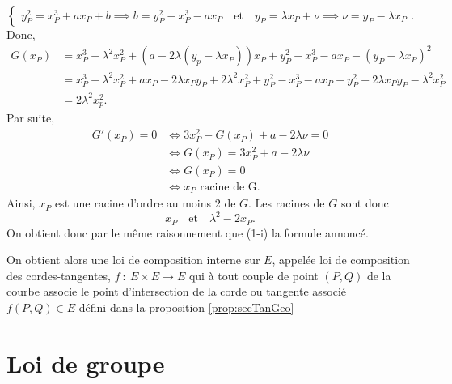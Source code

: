 \begin{demonstration}
\begin{description}
\begin{description}
\[\begin{cases}
                y_P^2=x_P^3+ax_P+b \implies b=y_P^2-x_P^3-ax_P \quad \text{et} \quad y_P=\lambda x_P + \nu \implies \nu = y_P - \lambda x_P
                    \end{cases}
                .\] 
                Donc,
                \begin{align*}
                    G(x_P) &=x_P^3-\lambda^2x_P^2+\left( a-2\lambda\left( y_p-\lambda x_P \right)  \right) x_P + y_P^2-x_P^3-ax_P-\left( y_P -\lambda x_P \right) ^2\\
                    &= x_P^3-\lambda^2 x_P^2+ax_P-2\lambda x_Py_P+2\lambda^2x_P^2+y_P^2-x_P^3-ax_P-y_P^2+2\lambda x_Py_P -\lambda^2x_P^2 \\
                    &= 2\lambda^2x_p^2 
                .\end{align*}
                Par suite,
                \begin{align*}
                    G'(x_P)=0 &\iff 3x_P^2-G(x_P)+a-2\lambda\nu =0 \\
                              & \iff G(x_P) = 3x_P^2+a-2\lambda\nu \\
                              & \iff G(x_P)=0 \\
                              & \iff x_P \text{ racine de G}
                .\end{align*}
Ainsi, $x_P$ est une racine d'ordre au moins $2$ de $G$. Les racines de $G$ sont donc 
\[
x_P \quad \text{et} \quad \lambda^2-2x_P
.\] 
On obtient donc par le même raisonnement que (1-i) la formule annoncé.
        \end{description}
    \end{description}
\end{demonstration}

On obtient alors une loi de composition interne sur $E$, appelée loi de composition des
cordes-tangentes, $f\ :\ E\times E \to E$ qui à tout couple de point $(P,Q)$ de la courbe
associe le point d'intersection de la corde ou tangente associé $f(P,Q) \in E$ défini
dans la proposition \ref{prop:secTanGeo} 

\begin{exemple}
\end{exemple}

\section{Loi de groupe}


